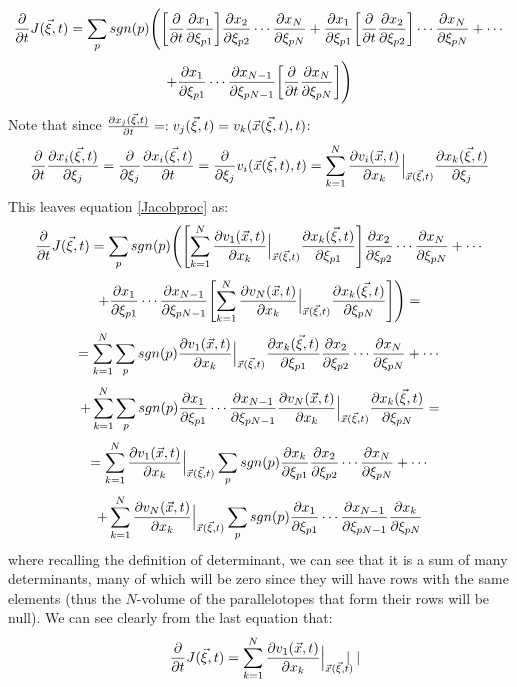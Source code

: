 \documentclass[11pt, a4paper]{article} %
\DeclareRobustCommand{\mybox}[2][gray!10]{%
\begin{tcolorbox}[   %
        left=0.2cm,
        right=0.2cm,
        top=0.15cm,
        bottom=0.15cm,
        colback=#1,
        colframe=#1,
        width=\dimexpr\textwidth\relax, 
        enlarge left by=0mm,
        boxsep=5pt,
        arc=0pt,outer arc=0pt,
        ]
        #2
\end{tcolorbox}
}
\begin{document}
\mybox{
\begin{equation}\label{Jacobproc}
\pdv{}{t}J(\vec{\xi},t)=\sum_p sgn(p) \Bigg(\qty[\pdv{}{t}\pdv{x_1}{\xi_{p1}}]\pdv{x_2}{\xi_{p2}} \cdots \pdv{x_N}{\xi_{pN}}+\pdv{x_1}{\xi_{p1}}\qty[\pdv{}{t}\pdv{x_2}{\xi_{p2}}] \cdots \pdv{x_N}{\xi_{pN}}+\cdots
\end{equation}
$$
+\pdv{x_1}{\xi_{p1}} \cdots \pdv{x_{N-1}}{\xi_{pN-1}}\qty[\pdv{}{t}\pdv{x_N}{\xi_{pN}}]\Bigg)
$$
Note that since $\pdv{x_j(\vec{\xi},t)}{t}=:v_j(\vec{\xi},t)=v_k(\vec{x}(\vec{\xi},t),t)$:
\begin{equation}
\pdv{}{t}\pdv{x_i(\vec{\xi},t)}{\xi_j}=\pdv{}{\xi_j}\pdv{x_i(\vec{\xi},t)}{t}=\pdv{}{\xi_j}v_i(\vec{x}(\vec{\xi},t),t)=\sum_{k=1}^N \pdv{v_i(\vec{x},t)}{x_k}\Big\rvert_{\vec{x}(\vec{\xi},t)}\pdv{x_k(\vec{\xi},t)}{\xi_j}
\end{equation}
This leaves equation \eqref{Jacobproc} as:
\begin{equation}
\pdv{}{t}J(\vec{\xi},t)=\sum_p sgn(p) \Bigg(\qty[\sum_{k=1}^N \pdv{v_1(\vec{x},t)}{x_k}\Big\rvert_{\vec{x}(\vec{\xi},t)}\pdv{x_k(\vec{\xi},t)}{\xi_{p1}}]\pdv{x_2}{\xi_{p2}} \cdots \pdv{x_N}{\xi_{pN}}+\cdots
\end{equation}
$$
+\pdv{x_1}{\xi_{p1}} \cdots \pdv{x_{N-1}}{\xi_{pN-1}}\qty[\sum_{k=1}^N \pdv{v_N(\vec{x},t)}{x_k}\Big\rvert_{\vec{x}(\vec{\xi},t)}\pdv{x_k(\vec{\xi},t)}{\xi_{pN}}]\Bigg)=
$$
$$
=\sum_{k=1}^N\sum_p sgn(p) \pdv{v_1(\vec{x},t)}{x_k}\Big\rvert_{\vec{x}(\vec{\xi},t)}\pdv{x_k(\vec{\xi},t)}{\xi_{p1}}\pdv{x_2}{\xi_{p2}} \cdots \pdv{x_N}{\xi_{pN}}+\cdots 
$$
$$
+ \sum_{k=1}^N\sum_p sgn(p)\pdv{x_1}{\xi_{p1}} \cdots \pdv{x_{N-1}}{\xi_{pN-1}}\pdv{v_N(\vec{x},t)}{x_k}\Big\rvert_{\vec{x}(\vec{\xi},t)}\pdv{x_k(\vec{\xi},t)}{\xi_{pN}}=
$$
$$
=\sum_{k=1}^N \pdv{v_1(\vec{x},t)}{x_k}\Big\rvert_{\vec{x}(\vec{\xi},t)}\sum_p sgn(p)\pdv{x_k}{\xi_{p1}}\pdv{x_2}{\xi_{p2}} \cdots \pdv{x_N}{\xi_{pN}}+\cdots 
$$
$$
+ \sum_{k=1}^N\pdv{v_N(\vec{x},t)}{x_k}\Big\rvert_{\vec{x}(\vec{\xi},t)}\sum_p sgn(p)\pdv{x_1}{\xi_{p1}} \cdots \pdv{x_{N-1}}{\xi_{pN-1}}\pdv{x_k}{\xi_{pN}}
$$
where recalling the definition of determinant, we can see that it is a sum of many determinants, many of which will be zero since they will have rows with the same elements (thus the $N$-volume of the parallelotopes that form their rows will be null). We can see clearly from the last equation that:
\begin{equation}
\pdv{}{t}J(\vec{\xi},t)=\sum_{k=1}^N \pdv{v_1(\vec{x},t)}{x_k}\Big\rvert_{\vec{x}(\vec{\xi},t)} \begin{vmatrix}

\end{vmatrix}
\end{equation}}
\end{document}
